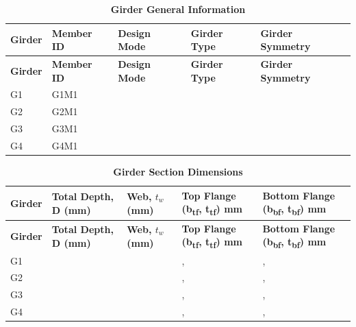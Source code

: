 \documentclass[12pt,a4paper]{report}
\numberwithin{table}{chapter}
\numberwithin{figure}{chapter}
\newcommand{\reportrowpad}{4pt}
\newcommand{\reportmediumgap}{0.6em}
\newcommand{\reportcaptiongap}{4pt}
\begin{document}
\vspace{\reportcaptiongap}
\begin{longtable}{|L{2.2cm}|L{1.8cm}|p{3.8cm}|p{3.8cm}|p{3.8cm}|}
\caption{\textbf{Girder General Information}}\\
\hline
\textbf{Girder} & \textbf{Member ID} & \textbf{Design Mode} & \textbf{Girder Type} & \textbf{Girder Symmetry} \\[\reportrowpad]
\hline
\endfirsthead
\hline
\textbf{Girder} & \textbf{Member ID} & \textbf{Design Mode} & \textbf{Girder Type} & \textbf{Girder Symmetry} \\[\reportrowpad]
\hline
\endhead
G1 & G1M1 &  &  &  \\[8pt]
\hline
G2 & G2M1 &  &  &  \\[8pt]
\hline
G3 & G3M1 &  &  &  \\[8pt]
\hline
G4 & G4M1 &  &  &  \\[8pt]
\hline
\end{longtable}

\vspace{\reportmediumgap}

\vspace{\reportcaptiongap}
\begin{longtable}{|L{1.8cm}|L{2.3cm}|L{1.8cm}|p{4.8cm}|p{4.8cm}|}
\caption{\textbf{Girder Section Dimensions}}\\
\hline
\textbf{Girder} & \textbf{Total Depth, D (mm)} & \textbf{Web, $t_w$ (mm)} & \textbf{Top Flange (b\textsubscript{tf}, t\textsubscript{tf}) mm} & \textbf{Bottom Flange (b\textsubscript{bf}, t\textsubscript{bf}) mm} \\[\reportrowpad]
\hline
\endfirsthead
\hline
\textbf{Girder} & \textbf{Total Depth, D (mm)} & \textbf{Web, $t_w$ (mm)} & \textbf{Top Flange (b\textsubscript{tf}, t\textsubscript{tf}) mm} & \textbf{Bottom Flange (b\textsubscript{bf}, t\textsubscript{bf}) mm} \\[\reportrowpad]
\hline
\endhead
G1 &  &  & ,  & ,  \\[8pt]
\hline
G2 &  &  & ,  & ,  \\[8pt]
\hline
G3 &  &  & ,  & ,  \\[8pt]
\hline
G4 &  &  & ,  & ,  \\[8pt]
\hline
\end{longtable}

\vspace{\reportmediumgap}
\end{document}
